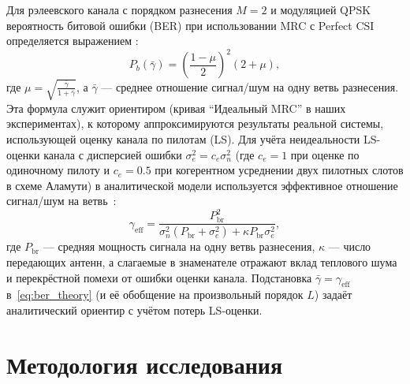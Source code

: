 \documentclass[a4paper,12pt]{article}
\numberwithin{equation}{section}
\begin{document}
Для рэлеевского канала с порядком разнесения $M=2$ и модуляцией QPSK вероятность битовой ошибки (BER) при использовании MRC с Perfect CSI определяется выражением \cite{proakis}:
\begin{equation}
P_b(\bar{\gamma}) = \left( \frac{1-\mu}{2} \right)^2 (2 + \mu),
\label{eq:ber_theory}
\end{equation}
где $\mu = \sqrt{\frac{\bar{\gamma}}{1+\bar{\gamma}}}$, а $\bar{\gamma}$ — среднее отношение сигнал/шум на одну ветвь разнесения. Эта формула служит ориентиром (кривая ``Идеальный MRC'' в наших экспериментах), к которому аппроксимируются результаты реальной системы, использующей оценку канала по пилотам (LS). Для учёта неидеальности LS-оценки канала с дисперсией ошибки $\sigma_e^2 = c_e \sigma_n^2$ (где $c_e = 1$ при оценке по одиночному пилоту и $c_e = 0.5$ при когерентном усреднении двух пилотных слотов в схеме Аламути) в аналитической модели используется эффективное отношение сигнал/шум на ветвь~\cite{proakis}: \begin{equation} \gamma_{\text{eff}} = \frac{P_{\text{br}}^2}{\sigma_n^2 (P_{\text{br}} + \sigma_e^2) + \kappa P_{\text{br}} \sigma_e^2}, \label{eq:gamma_eff} \end{equation} где $P_{\text{br}}$ --- средняя мощность сигнала на одну ветвь разнесения, $\kappa$ --- число передающих антенн, а слагаемые в знаменателе отражают вклад теплового шума и перекрёстной помехи от ошибки оценки канала. Подстановка $\bar{\gamma} = \gamma_{\text{eff}}$ в~\eqref{eq:ber_theory} (и её обобщение на произвольный порядок $L$) задаёт аналитический ориентир с учётом потерь LS-оценки.

\section{Методология исследования}
\end{document}
